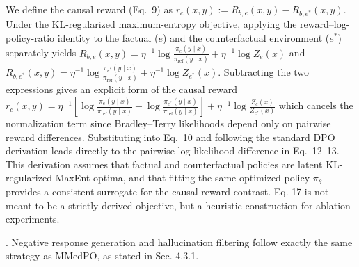 \documentclass[10pt,twocolumn,letterpaper]{article}
\begin{document}
We define the causal reward (Eq.~9) as $r_c(x,y):=R_{b,e}(x,y)-R_{b,e^\ast}(x,y)$. Under the KL-regularized maximum-entropy objective, applying the reward--log-policy-ratio identity to the factual ($e$) and the counterfactual environment ($e^\ast$) separately yields
$R_{b,e}(x,y)=\eta^{-1}\log\frac{\pi_e(y\mid x)}{\pi_{\mathrm{ref}}(y\mid x)}+\eta^{-1}\log Z_e(x)$ and $R_{b,e^\ast}(x,y)=\eta^{-1}\log\frac{\pi_{e^\ast}(y\mid x)}{\pi_{\mathrm{ref}}(y\mid x)}+\eta^{-1}\log Z_{e^\ast}(x)$. Subtracting the two expressions gives an explicit form of the causal reward $
r_c(x,y)
=
\eta^{-1}\!\left[
\log \frac{\pi_e(y\mid x)}{\pi_{\mathrm{ref}}(y\mid x)}
-
\log \frac{\pi_{e^\ast}(y\mid x)}{\pi_{\mathrm{ref}}(y\mid x)}
\right]
+
\eta^{-1}\log\frac{Z_e(x)}{Z_{e^\ast}(x)}
$ which cancels the normalization term
since Bradley–Terry likelihoods depend only on pairwise reward differences. 
Substituting into Eq.~10 and following the standard DPO derivation leads directly
to the pairwise log-likelihood difference in Eq.~12–13.
This derivation assumes that factual and counterfactual policies are latent
KL-regularized MaxEnt optima, and that fitting the same optimized policy $\pi_{\theta}$ provides a
consistent surrogate for the causal reward contrast. Eq. 17 is not meant to be a strictly derived objective, but a heuristic construction for ablation experiments.


. Negative response generation and hallucination filtering
follow exactly the same strategy as MMedPO, as stated in Sec. 4.3.1.
\end{document}
